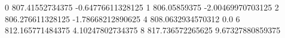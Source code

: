0 807.41552734375 -0.64776611328125
1 806.05859375 -2.00469970703125
2 806.276611328125 -1.78668212890625
4 808.0632934570312 0.0
6 812.165771484375 4.10247802734375
8 817.736572265625 9.67327880859375
